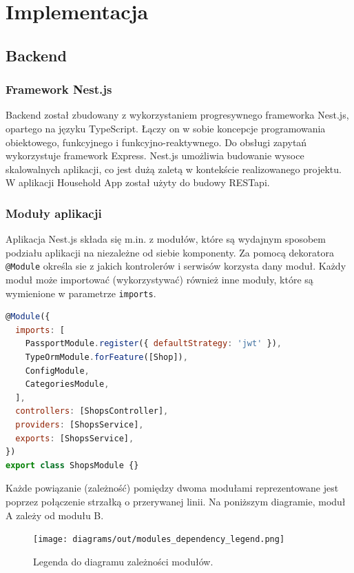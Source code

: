 \newpage

\section{Implementacja}


\subsection{Backend}

\subsubsection{Framework Nest.js}

Backend został zbudowany z wykorzystaniem progresywnego frameworka Nest.js, opartego na języku TypeScript. Łączy on w sobie koncepcje programowania obiektowego, funkcyjnego i funkcyjno-reaktywnego. Do obsługi zapytań wykorzystuje framework Express. Nest.js umożliwia budowanie wysoce skalowalnych aplikacji, co jest dużą zaletą w kontekście realizowanego projektu. W aplikacji Household App został użyty do budowy RESTapi.

\subsubsection{Moduły aplikacji}

Aplikacja Nest.js składa się m.in. z modułów, które są wydajnym sposobem podziału aplikacji na niezależne od siebie komponenty. Za pomocą dekoratora \lstinline{@Module} określa sie z jakich kontrolerów i serwisów korzysta dany moduł. Każdy moduł może importować (wykorzystywać) również inne moduły, które są wymienione w parametrze \lstinline{imports}.

\begin{lstlisting}[language=JavaScript, caption={Implementacja modułu \lstinline{ShopsModule}.}, label=lst:nest:module]
@Module({
  imports: [
    PassportModule.register({ defaultStrategy: 'jwt' }),
    TypeOrmModule.forFeature([Shop]),
    ConfigModule,
    CategoriesModule,
  ],
  controllers: [ShopsController],
  providers: [ShopsService],
  exports: [ShopsService],
})
export class ShopsModule {}
\end{lstlisting}

\newpage
Każde powiązanie (zależność) pomiędzy dwoma modułami reprezentowane jest poprzez połączenie strzałką o przerywanej linii. Na poniższym diagramie, moduł A zależy od modułu B.

\begin{figure}[!htb]
  \centering
  \texttt{[image: diagrams/out/modules\_dependency\_legend.png]}
  \caption{Legenda do diagramu zależności modułów.}
\end{figure}

